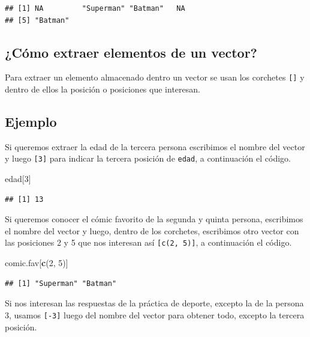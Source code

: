 \documentclass[10pt,]{krantz}
\makeatletter
\newenvironment{Shaded}{\begin{snugshade}}{\end{snugshade}}
\newcommand{\KeywordTok}[1]{\textcolor[rgb]{0.13,0.29,0.53}{\textbf{#1}}}
\newcommand{\DecValTok}[1]{\textcolor[rgb]{0.00,0.00,0.81}{#1}}
\newcommand{\NormalTok}[1]{#1}
\newenvironment{kframe}{%
\medskip{}
\setlength{\fboxsep}{.8em}
 \def\at@end@of@kframe{}%
 \ifinner\ifhmode%
  \def\at@end@of@kframe{\end{minipage}}%
  \begin{minipage}{\columnwidth}%
 \fi\fi%
 \def\FrameCommand##1{\hskip\@totalleftmargin \hskip-\fboxsep
 \colorbox{shadecolor}{##1}\hskip-\fboxsep
     \hskip-\linewidth \hskip-\@totalleftmargin \hskip\columnwidth}%
 \MakeFramed {\advance\hsize-\width
   \@totalleftmargin\z@ \linewidth\hsize
   \@setminipage}}%
 {\par\unskip\endMakeFramed%
 \at@end@of@kframe}
\renewenvironment{Shaded}{\begin{kframe}}{\end{kframe}}
\makeatother
\begin{document}
\begin{verbatim}
## [1] NA         "Superman" "Batman"   NA        
## [5] "Batman"
\end{verbatim}

\subsection{¿Cómo extraer elementos de un
vector?}\label{como-extraer-elementos-de-un-vector}

Para extraer un elemento almacenado dentro un vector se usan los
corchetes \texttt{{[}{]}} y dentro de ellos la posición o posiciones que
interesan.

\subsection*{Ejemplo}\label{ejemplo}


Si queremos extraer la edad de la tercera persona escribimos el nombre
del vector y luego \texttt{{[}3{]}} para indicar la tercera posición de
\texttt{edad}, a continuación el código.

\begin{Shaded}
\begin{Highlighting}[]
\NormalTok{edad[}\DecValTok{3}\NormalTok{]}
\end{Highlighting}
\end{Shaded}

\begin{verbatim}
## [1] 13
\end{verbatim}

Si queremos conocer el cómic favorito de la segunda y quinta persona,
escribimos el nombre del vector y luego, dentro de los corchetes,
escribimos otro vector con las posiciones 2 y 5 que nos interesan así
\texttt{{[}c(2,\ 5){]}}, a continuación el código.

\begin{Shaded}
\begin{Highlighting}[]
\NormalTok{comic.fav[}\KeywordTok{c}\NormalTok{(}\DecValTok{2}\NormalTok{, }\DecValTok{5}\NormalTok{)]}
\end{Highlighting}
\end{Shaded}

\begin{verbatim}
## [1] "Superman" "Batman"
\end{verbatim}

Si nos interesan las respuestas de la práctica de deporte, excepto la de
la persona 3, usamos \texttt{{[}-3{]}} luego del nombre del vector para
obtener todo, excepto la tercera posición.
\end{document}
